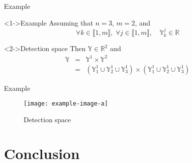 \documentclass{beamer}
\begin{document}
        \begin{frame}{Example}
            \begin{exampleblock}<1->{Example}
                Assuming that $n = 3$, $m = 2$, and
                $$\forall k \in \llbracket 1, m\rrbracket, \;  \forall j \in \llbracket 1, m\rrbracket, \quad \mathbb{Y}_k^j \in \mathbb{R}$$
            \end{exampleblock}
            \begin{exampleblock}<2->{Detection space}
                Then $\mathbb{Y} \in \mathbb{R}^2$ and
                \begin{eqnarray}
                    \mathbb{Y} & = & \mathbb{Y}^1 \times \mathbb{Y}^2 \\
                    & = & \left(\mathbb{Y}_1^1 \cup \mathbb{Y}_2^1 \cup \mathbb{Y}_3^1\right) \times \left(\mathbb{Y}_1^1 \cup \mathbb{Y}_2^1 \cup \mathbb{Y}_3^1\right)
                \end{eqnarray}
            \end{exampleblock}
        \end{frame}

        \begin{frame}{Example}
            \begin{figure}
                \texttt{[image: example-image-a]}
                \caption{Detection space}
            \end{figure}
        \end{frame}

    \section{Conclusion}
\end{document}
